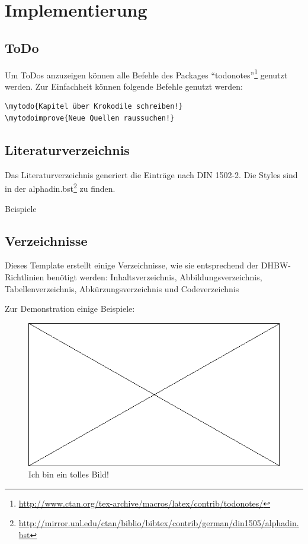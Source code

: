 \chapter{Implementierung}

\section{ToDo}

Um ToDos anzuzeigen können alle Befehle des Packages \enquote{todonotes}\footnote{\url{http://www.ctan.org/tex-archive/macros/latex/contrib/todonotes/}} genutzt werden.
Zur Einfachheit können folgende Befehle genutzt werden:

\begin{verbatim}
\mytodo{Kapitel über Krokodile schreiben!}
\mytodoimprove{Neue Quellen raussuchen!}
\end{verbatim}


\section{Literaturverzeichnis}

Das Literaturverzeichnis generiert die Einträge nach DIN 1502-2. Die Styles sind in der alphadin.bst\footnote{\url{http://mirror.unl.edu/ctan/biblio/bibtex/contrib/german/din1505/alphadin.bst}} zu finden.

Beispiele \cite{web:wiki:latex,book:komascript}

\section{Verzeichnisse}

Dieses Template erstellt einige Verzeichnisse, wie sie entsprechend der DHBW-Richtlinien benötigt werden: Inhaltsverzeichnis, Abbildungsverzeichnis, Tabellenverzeichnis, Abkürzungsverzeichnis und Codeverzeichnis

Zur Demonstration einige Beispiele:

\begin{figure}[H]
\centering
\includegraphics[width=\textwidth]{Images/placeholder.png}
\caption{Ich bin ein tolles Bild!}
\end{figure}

